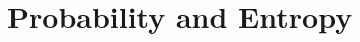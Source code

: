 \documentclass[11pt,fleqn]{book} %
\begin{document}
\chapter{Probability and Entropy}
\setcounter{page}{1}



%
%
%
%
%
%
%
%
%

\end{document}
